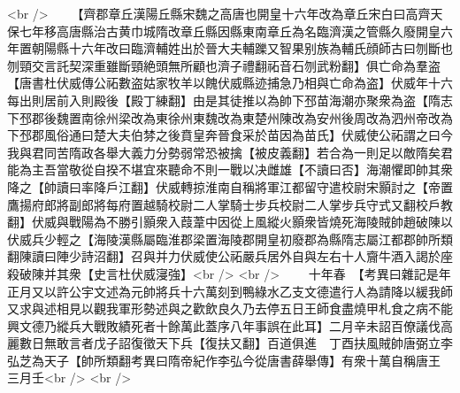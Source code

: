<br />
　　【齊郡章丘漢陽丘縣宋魏之高唐也開皇十六年改為章丘宋白曰高齊天保七年移高唐縣治古黄巾城隋改章丘縣因縣東南章丘為名臨濟漢之管縣久廢開皇六年置朝陽縣十六年改曰臨濟輔姓出於晉大夫輔躒又智果别族為輔氏顔師古曰刎斷也刎頸交言託契深重雖斷頸絶頭無所顧也濟子禮翻祏音石刎武粉翻】俱亡命為羣盗【唐書杜伏威傳公祏數盗姑家牧羊以餽伏威縣迹捕急乃相與亡命為盗】伏威年十六每出則居前入則殿後【殿丁練翻】由是其徒推以為帥下邳苗海潮亦聚衆為盗【隋志下邳郡後魏置南徐州梁改為東徐州東魏改為東楚州陳改為安州後周改為泗州帝改為下邳郡風俗通曰楚大夫伯棼之後賁皇奔晉食采於苗因為苗氏】伏威使公祏謂之曰今我與君同苦隋政各舉大義力分勢弱常恐被擒【被皮義翻】若合為一則足以敵隋矣君能為主吾當敬從自揆不堪宜來聽命不則一戰以决雌雄【不讀曰否】海潮懼即帥其衆降之【帥讀曰率降戶江翻】伏威轉掠淮南自稱將軍江都留守遣校尉宋顥討之【帝置鷹揚府郎將副郎將每府置越騎校尉二人掌騎士步兵校尉二人掌步兵守式又翻校戶教翻】伏威與戰陽為不勝引顥衆入葭葦中因從上風縱火顥衆皆燒死海陵賊帥趙破陳以伏威兵少輕之【海陵漢縣屬臨淮郡梁置海陵郡開皇初廢郡為縣隋志屬江都郡帥所類翻陳讀曰陣少詩沼翻】召與并力伏威使公祏嚴兵居外自與左右十人齎牛酒入謁於座殺破陳并其衆【史言杜伏威寖強】<br />
<br />
　　十年春　【考異曰雜記是年正月又以許公宇文述為元帥將兵十六萬刻到鴨綠水乙支文德遣行人為請降以緩我師又求與述相見以觀我軍形勢述與之歡飲良久乃去停五日王師食盡燒甲札食之病不能興文德乃縱兵大戰敗績死者十餘萬此蓋序八年事誤在此耳】二月辛未詔百僚議伐高麗數日無敢言者戊子詔復徵天下兵【復扶又翻】百道俱進　丁酉扶風賊帥唐弼立李弘芝為天子【帥所類翻考異曰隋帝紀作李弘今從唐書薛舉傳】有衆十萬自稱唐王　三月壬<br />
<br />

